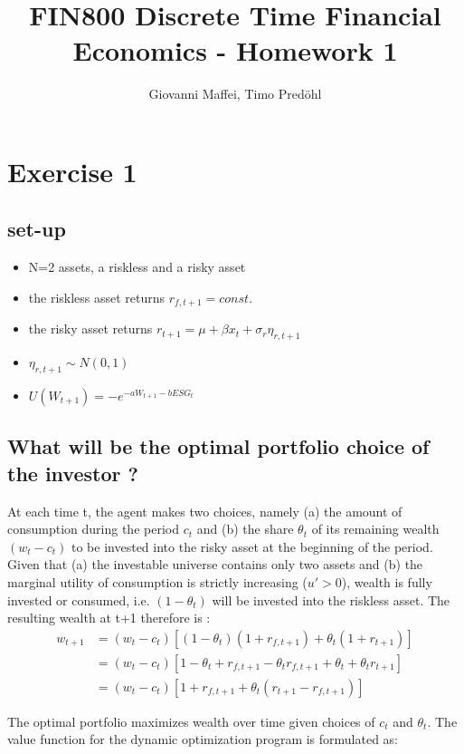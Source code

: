 \documentclass[]{article}
\title{FIN800 Discrete Time Financial Economics - Homework 1}
\author{Giovanni Maffei, Timo Predöhl}
\begin{document}
\maketitle

\section{Exercise 1}
\subsection{set-up}
\begin{itemize}
	\item N=2 assets, a riskless and a risky asset
	\item the riskless asset returns $r_{f, t+1} = const.$
	\item the risky asset returns $r_{t+1} = \mu + \beta x_t + \sigma_r \eta_{r, t+1}$
	\item $\eta_{r, t+1} \sim N(0,1)$
	\item  $U(W_{t+1}) = -e^{-aW_{t+1}-bESG_t}$
\end{itemize}

\subsection{What will be the optimal portfolio choice of the investor ?}
At each time t, the agent makes two choices, namely (a) the amount of consumption during the period $c_t$ and (b) the share $\theta_t$ of its remaining wealth $(w_t - c_t)$ to be invested into the risky asset at the beginning of the period. Given that (a) the investable universe contains only two assets and (b) the marginal utility of consumption is strictly increasing ($u'>0$), wealth is fully invested or consumed, i.e. $(1-\theta_t)$ will be invested into the riskless asset. The resulting wealth at t+1 therefore is :
\begin{align*}
	w_{t+1} &= (w_t - c_t)\left[(1-\theta_t)(1+r_{f, t+1})+ \theta_t(1+r_{t+1}) \right]\\
	&= (w_t - c_t) \left[1 -\theta_t + r_{f,t+1} - \theta_t r_{f,t+1} + \theta_t + \theta_t r_{t+1}\right]\\
	&= (w_t - c_t) \left[1 + r_{f,t+1} + \theta_t(r_{t+1}-r_{f, t+1}) \right]
\end{align*}



The optimal portfolio maximizes wealth over time given choices of $c_t$ and $\theta_t$. The value function for the dynamic optimization program is formulated as:
\end{document}
